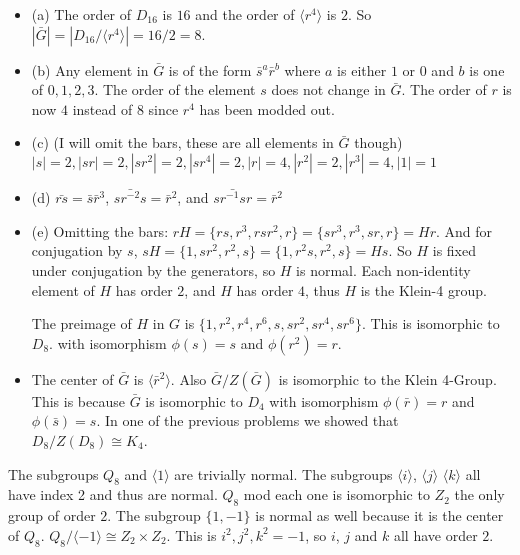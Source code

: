\documentclass[12pt]{report}
\begin{document}
\begin{itemize}
  \item (a) The order of $D_16$ is $16$ and the order of $\langle r^4 \rangle$
        is $2$. So $|\bar{G}| = |D_16/\langle r^4 \rangle| = 16/2 = 8$.

  \item (b) Any element in $\bar{G}$ is of the form $\bar{s}^a\bar{r}^b$ where
        $a$ is either $1$ or $0$ and $b$ is one of $0,1,2,3$. The order of the
        element $s$ does not change in $\bar{G}$. The order of $r$ is now $4$
        instead of $8$ since $r^4$ has been modded out.

  \item (c) (I will omit the bars, these are all elements in $\bar{G}$ though)
        ${|s| = 2, |sr| = 2, |sr^2| = 2, |sr^4| = 2, |r| = 4, |r^2| = 2, |r^3|
         = 4, |1| = 1}$

  \item (d) $\bar{rs} = \bar{s}\bar{r}^3$, $\bar{sr^{-2}s} = \bar{r}^2$, and
        $\bar{sr^{-1}sr} = \bar{r}^2$

  \item (e) Omitting the bars: $rH = \{ rs, r^3, rsr^2, r \}= \{ sr^3, r^3, sr,
        r\} = Hr$. And for conjugation by $s$, $sH = \{ 1, sr^2, r^2, s \}=
        \{ 1, r^2s, r^2, s\} = Hs$. So $H$ is fixed under conjugation by the
        generators, so $H$ is normal. Each non-identity element of $H$ has order
        $2$, and $H$ has order $4$, thus $H$ is the Klein-4 group.

        The preimage of $H$ in $G$ is $\{ 1, r^2, r^4, r^6,s,sr^2,sr^4,sr^6 \}$.
        This is isomorphic to $D_8$. with isomorphism $\phi(s) = s$ and
        $\phi(r^2) = r$.

  \item The center of $\bar{G}$ is $\langle \bar{r}^2 \rangle$. Also $\bar{G}/Z
         (\bar{G})$ is isomorphic to the Klein 4-Group. This is because
         $\bar{G}$ is isomorphic to $D_4$ with isomorphism $\phi(\bar{r}) = r$
         and $\phi(\bar{s}) = s$. In one of the previous problems we showed that
         $D_8/Z(D_8) \cong K_4$.


\end{itemize}

 The subgroups $Q_8$ and $\langle 1 \rangle$ are
trivially normal. The subgroups $\langle i \rangle$, $\langle j \rangle$
$\langle k \rangle$ all have index 2 and thus are normal. $Q_8$ mod each one is
isomorphic to $Z_2$ the only group of order $2$. The subgroup $\{ 1, -1 \}$ is
normal as well because it is the center of $Q_8$. $Q_8 / \langle -1 \rangle
\cong Z_2 \times Z_2$. This is $i^2, j^2, k^2 = -1$, so $i$, $j$ and $k$ all
have order $2$. 
\end{document}
